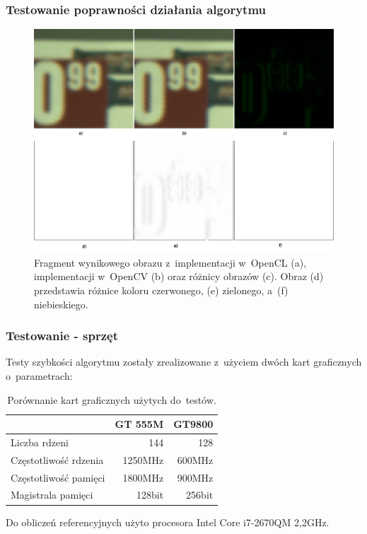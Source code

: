 \documentclass{beamer}
\begin{document}
\begin{frame}
  \frametitle{Testowanie poprawności działania algorytmu}
\begin{figure}
  \centering
  \includegraphics[width=0.55\linewidth]{result_diff}
  \caption{Fragment wynikowego obrazu z~implementacji w~OpenCL (a), implementacji w~OpenCV (b) oraz różnicy obrazów (c). Obraz (d) przedstawia różnice koloru czerwonego, (e) zielonego, a~(f) niebieskiego.}
  \label{fig:result_diff}
\end{figure}
\end{frame}

\begin{frame}
  \frametitle{Testowanie - sprzęt}
  Testy szybkości algorytmu zostały zrealizowane z~użyciem dwóch kart graficznych o~parametrach:
\begin{center}
\begin{table}
  \caption{Porównanie kart graficznych użytych do~testów.}
  \label{tab:gpus}
     \begin{tabular}{ |l | r | r | }
     \hline
       & GT 555M & GT9800 \\ \hline
     Liczba rdzeni & 144 & 128 \\ \hline
     Częstotliwość rdzenia & 1250MHz & 600MHz \\ \hline
     Częstotliwość pamięci & 1800MHz & 900MHz \\ \hline
     Magistrala pamięci & 128bit & 256bit \\ \hline

   \end{tabular}

\end{table}
\end{center}
Do obliczeń referencyjnych użyto procesora Intel Core i7-2670QM 2,2GHz.
\end{frame}
\end{document}
